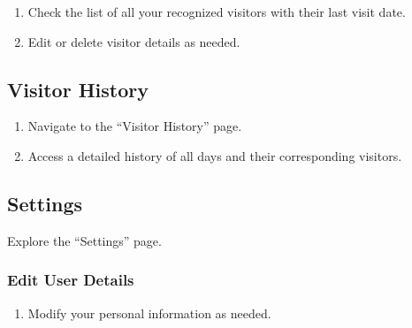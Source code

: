 \documentclass[a4 paper, 12pt]{article}
\begin{document}
\begin{enumerate}
  \item Check the list of all your recognized visitors with their last visit date.
  \item Edit or delete visitor details as needed.
\end{enumerate}

\subsection{Visitor History}

\begin{enumerate}
  \item Navigate to the ``Visitor History'' page.
  \item Access a detailed history of all days and their corresponding visitors.
\end{enumerate}

\subsection{Settings}

Explore the ``Settings'' page.

\subsubsection{Edit User Details}

\begin{enumerate}
  \item Modify your personal information as needed.
\end{enumerate}

\newpage
\end{document}
